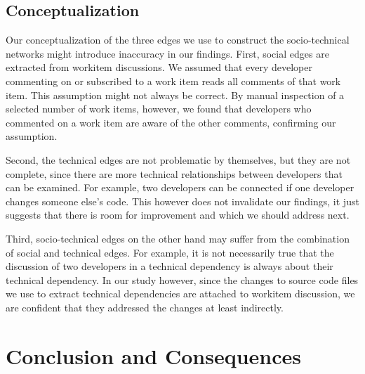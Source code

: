 \documentclass{sig-alternate}
\begin{document}
\subsection{Conceptualization}
Our conceptualization of the three edges we use to construct the
socio-technical networks might introduce inaccuracy in our findings.
First, social edges are extracted from workitem discussions. We assumed that
every developer commenting on or subscribed to a work item reads all comments of that
work item. This assumption might not always be correct. By manual inspection of
a selected number of work items, however, we found that developers who
commented on a work item are aware of the other comments, confirming our assumption.

Second, the technical edges are not problematic by themselves, but they are not
complete, since there are more technical relationships between developers that
can be examined. For example, two developers can be connected if one developer
changes someone else's code. This however does not invalidate our findings, it
just suggests that there is room for improvement and which we should address
next.

Third, socio-technical edges on the other hand may suffer from the combination of
social and technical edges. For example, it is not necessarily true that the
discussion of  two developers in a technical dependency is always about their
technical dependency.  In our study however, since the changes to
source code files we use to extract technical dependencies are attached to workitem discussion, we are
confident that they addressed the changes at least indirectly.












\section{Conclusion and Consequences}
\end{document}
